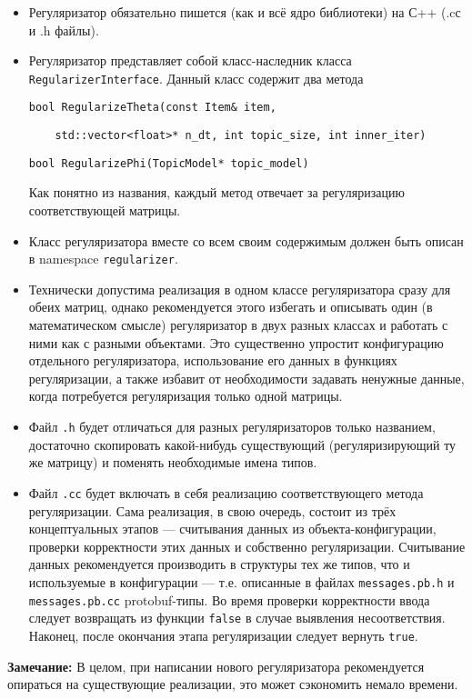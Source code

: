 \begin{itemize}
	\item Регуляризатор обязательно пишется (как и всё ядро библиотеки) на С++ (.cс и .h файлы).

	\item Регуляризатор представляет собой класс-наследник класса \verb'RegularizerInterface'. Данный класс содержит два метода
	
	\vspace{10pt}
	\verb|bool RegularizeTheta(const Item& item,| 
	
	\verb|    std::vector<float>* n_dt, int topic_size, int inner_iter)|
	
	\verb'bool RegularizePhi(TopicModel* topic_model)'
	\vspace{10pt}
	
	Как понятно из названия, каждый метод отвечает за регуляризацию соответствующей матрицы.
	
	\item Класс регуляризатора вместе со всем своим содержимым должен быть описан в namespace \verb'regularizer'.
	
	\item Технически допустима реализация в одном классе регуляризатора сразу для обеих матриц, однако рекомендуется этого избегать и описывать один (в математическом смысле) регуляризатор в двух разных классах и работать с ними как с разными объектами. Это существенно упростит конфигурацию отдельного регуляризатора, использование его данных в функциях регуляризации, а также избавит от необходимости задавать ненужные данные, когда потребуется регуляризация только одной матрицы.
	
	\item Файл \verb'.h' будет отличаться для разных регуляризаторов только названием, достаточно скопировать какой-нибудь существующий (регуляризирующий ту же матрицу) и поменять необходимые имена типов.
	
	\item Файл \verb'.cc' будет включать в себя реализацию соответствующего метода регуляризации. Сама реализация, в свою очередь, состоит из трёх концептуальных этапов --- считывания данных из объекта-конфигурации, проверки корректности этих данных и собственно регуляризации. Считывание данных рекомендуется производить в структуры тех же типов, что и используемые в конфигурации --- т.е. описанные в файлах \verb'messages.pb.h' и \verb'messages.pb.cc' protobuf-типы. Во время проверки корректности ввода следует возвращать из функции \verb'false' в случае выявления несоответствия. Наконец, после окончания этапа регуляризации следует вернуть \verb'true'.
	
\end{itemize}

{\bf Замечание: } В целом, при написании нового регуляризатора рекомендуется опираться на существующие реализации, это может сэкономить немало времени.
